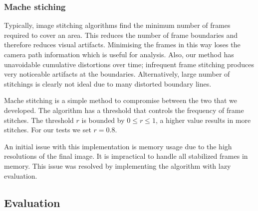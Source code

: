 \subsubsection{Mache stiching}

Typically, image stitching algorithms find the minimum number of frames required to cover an area.
This reduces the number of frame boundaries and therefore reduces visual artifacts.
Minimising the frames in this way loses the camera path information which is useful for analysis.
Also, our method has unavoidable cumulative distortions over time;
infrequent frame stitching produces very noticeable artifacts at the boundaries.
Alternatively, large number of stitchings is clearly not ideal due to many distorted boundary lines.

Mache stitching is a simple method to compromise between the two that we developed.
The algorithm has a threshold that controls the frequency of frame stitches.
The threshold $r$ is bounded by $0\leq r \leq1$, a higher value results in more stitches.
For our tests we set $r=0.8$.

\begin{algorithmic}
    \ENDIF
  \ENDFOR
\end{algorithmic}

An initial issue with this implementation is memory usage due to the high resolutions of the final image.
It is impractical to handle all stabilized frames in memory.
This issue was resolved by implementing the algorithm with lazy evaluation.

\subsection{Evaluation}

